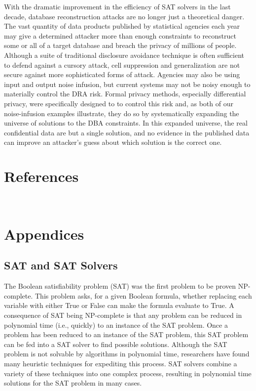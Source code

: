 \documentclass[runningheads]{llncs}
\begin{document}
With the dramatic improvement in the efficiency of SAT solvers in the
last decade, database reconstruction attacks are no longer just a 
theoretical danger. The vast quantity of data products published by
statistical agencies each year may give a determined attacker 
more than enough constraints to reconstruct some or all of a target database and
breach the privacy of millions of people. Although a suite of traditional
disclosure avoidance technique is often sufficient to defend against a cursory attack, cell suppression and generalization are not secure against more sophisticated
forms of attack. Agencies may also be using input and output noise infusion, but 
current systems may not be noisy enough to materially control the DRA risk.
Formal privacy methods, especially differential privacy, were specifically
designed to to control this risk and, as both of our noise-infusion examples
illustrate, they do so by systematically expanding the universe of solutions
to the DBA constraints. In this expanded universe, the real confidential data
are but a single solution, and no evidence in the published data can improve 
an attacker's guess about which solution is the correct one.

\section{References}\




\section{Appendices}

\subsection{SAT and SAT Solvers}

The Boolean satisfiability problem (SAT) was the first
problem to be proven NP-complete\cite{cooklevin}. This problem asks,
for a given Boolean formula, whether replacing each variable with
either True or False can make the formula evaluate to True.  A
consequence of SAT being NP-complete is that any problem can be
reduced in polynomial time (i.e., quickly) to an instance of the SAT
problem. Once a problem has been reduced to an instance of the SAT
problem, this SAT problem can be fed into a SAT solver to find
possible solutions. Although the SAT problem is not solvable by
algorithms in polynomial time, researchers have found many heuristic
techniques for expediting this process. SAT solvers combine a variety
of these techniques into one complex process, resulting in polynomial
time solutions for the SAT problem in many cases.
\end{document}
